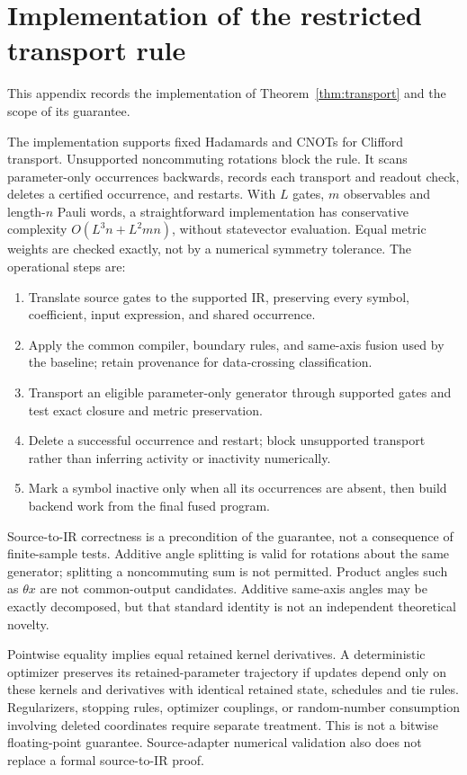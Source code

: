 \section{Implementation of the restricted transport rule}
\label{app:transport_impl}
This appendix records the implementation of
Theorem~\ref{thm:transport} and the scope of its guarantee.

The implementation supports fixed Hadamards and CNOTs for Clifford
transport. Unsupported noncommuting rotations block the rule. It scans
parameter-only occurrences backwards, records each transport and
readout check, deletes a certified occurrence, and restarts. With $L$
gates, $m$ observables and length-$n$ Pauli words, a straightforward
implementation has conservative complexity $O(L^3n+L^2mn)$, without
statevector evaluation. Equal metric weights are checked exactly,
not by a numerical symmetry tolerance. The operational steps are:
\begin{enumerate}
\item Translate source gates to the supported IR, preserving every
symbol, coefficient, input expression, and shared occurrence.
\item Apply the common compiler, boundary rules, and same-axis fusion
used by the baseline; retain provenance for data-crossing classification.
\item Transport an eligible parameter-only generator through supported
gates and test exact closure and metric preservation.
\item Delete a successful occurrence and restart; block unsupported
transport rather than inferring activity or inactivity numerically.
\item Mark a symbol inactive only when all its occurrences are absent,
then build backend work from the final fused program.
\end{enumerate}
Source-to-IR correctness is a precondition of the guarantee, not a
consequence of finite-sample tests. Additive angle splitting is valid
for rotations about the same generator; splitting a noncommuting
sum is not permitted. Product angles such as
$\theta x$ are not common-output candidates. Additive same-axis
angles may be exactly decomposed, but that standard identity is not
an independent theoretical novelty.

Pointwise equality implies equal retained kernel derivatives.
A deterministic optimizer preserves its retained-parameter trajectory
if updates depend only on these kernels and derivatives with identical
retained state, schedules and tie rules. Regularizers, stopping rules,
optimizer couplings, or random-number consumption involving deleted
coordinates require separate treatment. This is not a bitwise
floating-point guarantee. Source-adapter numerical validation also
does not replace a formal source-to-IR proof.
